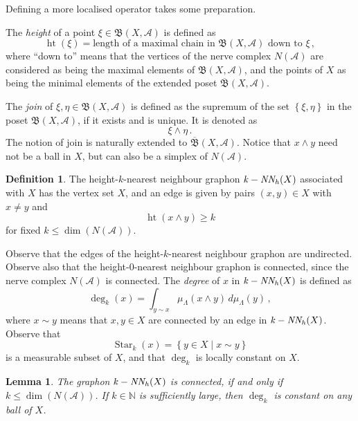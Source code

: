 \documentclass[a4paper,draft]{ZbRad}
\theoremstyle{plain}
\newtheorem{lem}{Lemma}[section]
\theoremstyle{definition}
\newtheorem{dfn}{Definition}[section]
\numberwithin{equation}{section}
\renewcommand{\le}{\leqslant}\renewcommand{\leq}{\leqslant}
\renewcommand{\ge}{\geqslant}\renewcommand{\geq}{\geqslant}
\newcommand{\mathset}[1]{{\left\{#1\right\}}}
\DeclareMathOperator{\Star}{Star}
\DeclareMathOperator{\kNNh}{\it{k-NN_h}}
\DeclareMathOperator{\height}{ht}
\begin{document}
Defining a more localised operator takes some preparation.
\newline

The \emph{height} of a point $\xi\in\mathfrak{B}(X,\mathcal{A})$ is defined as
\[
\height(\xi)=\text{length of a maximal chain in $\mathfrak{B}(X,\mathcal{A})$ down to $\xi$}\,,
\]
where ``down to'' means that the vertices of the nerve complex $N(\mathcal{A})$ are considered as being the maximal elements of $\mathfrak{B}(X,\mathcal{A})$, and
the points of $X$ as being the minimal elements of the extended poset $\overline{\mathfrak{B}}(X,\mathcal{A})$.
\newline

The \emph{join} of $\xi,\eta\in\mathfrak{B}(X,\mathcal{A})$ is defined as the supremum of the set $\mathset{\xi,\eta}$ in the poset $\mathfrak{B}(X,\mathcal{A})$, if it exists and is unique. 
It is denoted as
\[
\xi\wedge\eta\,.
\]
The notion of join is naturally extended to $\overline{\mathfrak{B}}(X,\mathcal{A})$. Notice that $x\wedge y$ need not be a ball in $X$, but can also be a simplex of $N(\mathcal{A})$.

\begin{dfn}
The height-$k$-nearest neighbour graphon $\kNNh(X)$
associated with $X$ has the vertex set $X$, and an edge is given by pairs 
$(x,y)\in X$ with 
$x\neq y$ and
\[
\height(x \wedge y) \ge k
\]
for fixed $k \le\dim(N(\mathcal{A}))$.
\end{dfn}

Observe that the edges of the height-$k$-nearest neighbour graphon
are undirected. Observe also that the height-$0$-nearest neighbour graphon is connected, since the nerve complex $N(\mathcal{A})$ is connected.
The \emph{degree} of $x$ in $\kNNh(X)$ is defined as
\[
\deg_k(x)=\int_{y\sim x}\mu_\Lambda(x\wedge y)\,d\mu_\Lambda(y)\,,
\]
where $x\sim y$ means that $x,y\in X$ are connected by an edge in $\kNNh(X)$. Observe that 
\[
\Star_k(x)=\mathset{y\in X\mid x\sim y}
\]
is a measurable subset of $X$, and that $\deg_k$ is locally constant on $X$.

\begin{lem}\label{degreeConst}
The graphon $\kNNh(X)$ is connected, if and only if $k\le\dim(N(\mathcal{A}))$.
If $k\in\mathbb{N}$ is sufficiently large, then  $\deg_k$ is constant on any ball of $X$.
\end{lem}
\end{document}
